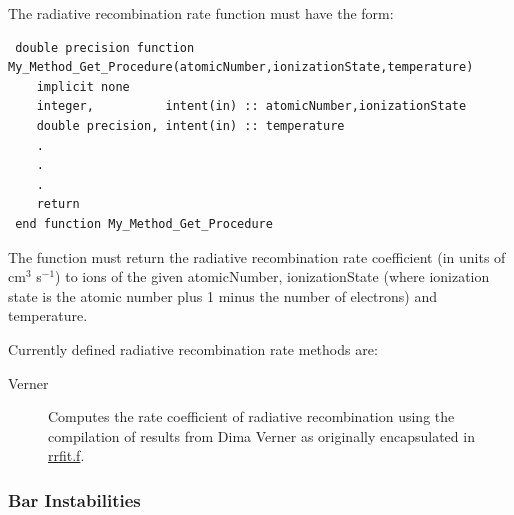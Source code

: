 The radiative recombination rate function must have the form:
\begin{verbatim}
 double precision function My_Method_Get_Procedure(atomicNumber,ionizationState,temperature)
    implicit none
    integer,          intent(in) :: atomicNumber,ionizationState
    double precision, intent(in) :: temperature
    .
    .
    .
    return
 end function My_Method_Get_Procedure
\end{verbatim}
The function must return the radiative recombination rate coefficient (in units of cm$^3$ s$^{-1}$) to ions of the given {\normalfont \ttfamily atomicNumber}, {\normalfont \ttfamily ionizationState} (where ionization state is the atomic number plus 1 minus the number of electrons) and {\normalfont \ttfamily temperature}.

Currently defined radiative recombination rate methods are:
\begin{description}
 \item [{\normalfont \ttfamily Verner}]  Computes the rate coefficient of radiative recombination using the compilation of results from Dima Verner as originally encapsulated in \href{ftp://gradj.pa.uky.edu//dima//rec//rrfit.f}{{\normalfont \ttfamily rrfit.f}}.
\end{description}

\subsubsection{Bar Instabilities}

